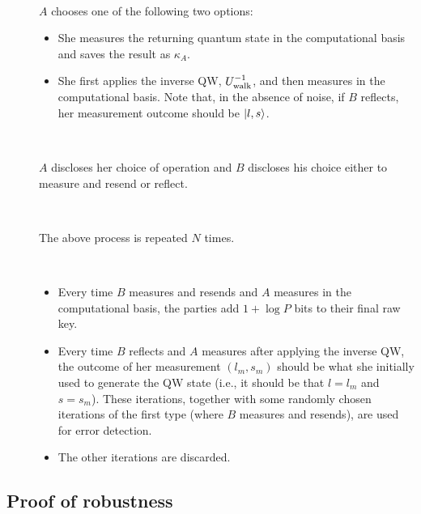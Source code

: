 \begin{protocol}
\begin{description}
  \item[\hspace{6mm}{\bf $A$'s final step} ]\
  
  $A$ chooses one of the following two options:
  \begin{itemize}
  	\item She measures the returning quantum state in the computational basis and saves the result as $\kappa_A$. 
  	\item She first applies the inverse QW, $U_{\textnormal{walk}}^{-1}$, and then measures in the computational basis. Note that, in the absence of noise, if $B$ reflects, her measurement outcome should be $| l,s \rangle$.
   \end{itemize}

\vspace{3mm}
  \item[\hspace{6mm}{\bf Disclosure}]\
   
  $A$ discloses her choice of operation and $B$ discloses his choice either to measure and resend or reflect.
  
  \vspace{3mm}
   \item[\hspace{6mm}{\bf Iterations} ]\
   
  The above process is repeated $N$ times. 
  
  \vspace{3mm}
   \item[\hspace{6mm}{\bf Results} ]\
  \begin{itemize}
  	\item Every time $B$ measures and resends and $A$ measures in the computational basis, the parties add $1+\log P$ bits  to their final raw key.  
  	\item Every time $B$ reflects and $A$ measures after applying the inverse QW, the outcome of her measurement $(l_m,s_m)$ should be what she initially used to generate the QW state (i.e., it should be that $l=l_m$ and $s=s_m$). These iterations, together with some randomly chosen iterations of the first type (where $B$ measures and resends), are used for error detection. 
  	\item The other iterations are discarded.
  \end{itemize}
\end{description}
\end{protocol}

\subsection{Proof of robustness}

